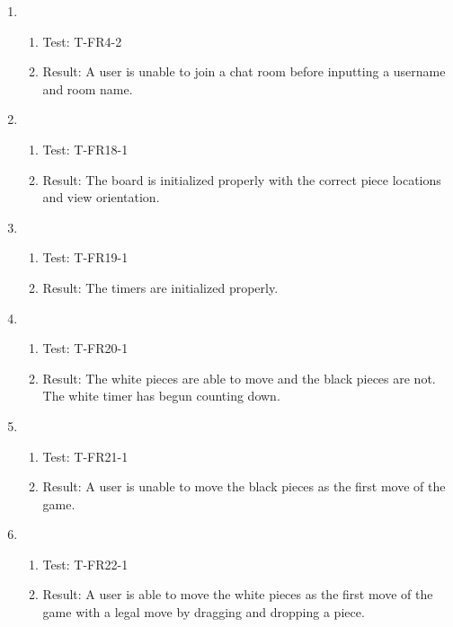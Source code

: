\documentclass[12pt, titlepage]{article}
\begin{document}
\begin{enumerate}[\indent {}]
        \item 
            \begin{enumerate}[ ]
                \item Test: T-FR4-2
                \item Result: A user is unable to join a chat room before inputting a username and room name.
            \end{enumerate}
    
        \item 
            \begin{enumerate}[ ]
                \item Test: T-FR18-1
                \item Result: The board is initialized properly with the correct piece locations and view orientation.
            \end{enumerate}
            
        \item 
            \begin{enumerate}[ ]
                \item Test: T-FR19-1
                \item Result: The timers are initialized properly.
            \end{enumerate}
            
        \item 
            \begin{enumerate}[ ]
                \item Test: T-FR20-1
                \item Result: The white pieces are able to move and the black pieces are not. The white timer has begun counting down.
            \end{enumerate}
            
        \item 
            \begin{enumerate}[ ]
                \item Test: T-FR21-1
                \item Result: A user is unable to move the black pieces as the first move of the game.
            \end{enumerate}
            
        \item 
            \begin{enumerate}[ ]
                \item Test: T-FR22-1
                \item Result: A user is able to move the white pieces as the first move of the game with a legal move by dragging and dropping a piece.
            \end{enumerate}
            

\end{enumerate}
\end{document}
